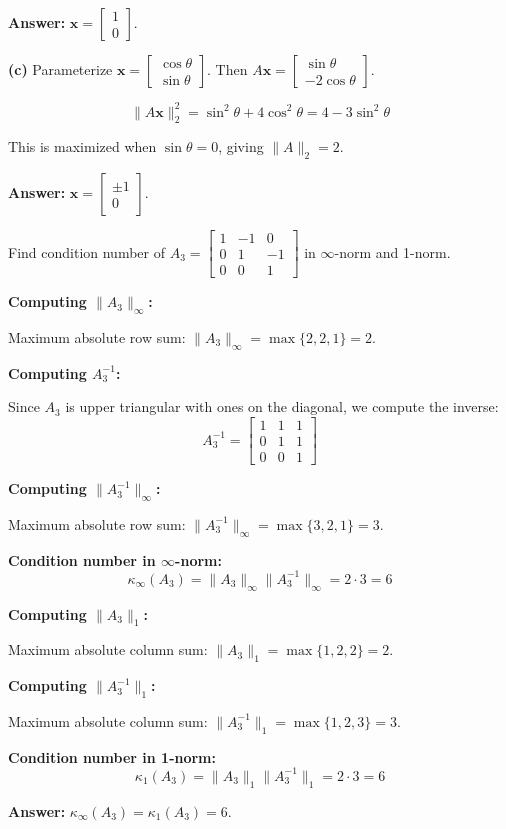 \documentclass[reqno]{exam}
\begin{document}
\begin{questions}
\begin{solution}
\textbf{Answer:} $\mathbf{x} = \begin{bmatrix} 1 \\ 0 \end{bmatrix}$.

\textbf{(c)} Parameterize $\mathbf{x} = \begin{bmatrix} \cos\theta \\ \sin\theta \end{bmatrix}$. Then $A\mathbf{x} = \begin{bmatrix} \sin\theta \\ -2\cos\theta \end{bmatrix}$.

\[
\|A\mathbf{x}\|_2^2 = \sin^2\theta + 4\cos^2\theta = 4 - 3\sin^2\theta
\]

This is maximized when $\sin\theta = 0$, giving $\|A\|_2 = 2$.

\textbf{Answer:} $\mathbf{x} = \begin{bmatrix} \pm 1 \\ 0 \end{bmatrix}$.
\end{solution}

\newpage 
\question[10] Find condition number of $A_3 = \begin{bmatrix} 1 & -1 & 0 \\ 0 & 1 & -1 \\ 0 & 0 & 1 \end{bmatrix}$ in $\infty$-norm and 1-norm.

\begin{solution}
\textbf{Computing $\|A_3\|_\infty$:}

Maximum absolute row sum: $\|A_3\|_\infty = \max\{2, 2, 1\} = 2$.

\textbf{Computing $A_3^{-1}$:}

Since $A_3$ is upper triangular with ones on the diagonal, we compute the inverse:
\[
A_3^{-1} = \begin{bmatrix} 1 & 1 & 1 \\ 0 & 1 & 1 \\ 0 & 0 & 1 \end{bmatrix}
\]

\textbf{Computing $\|A_3^{-1}\|_\infty$:}

Maximum absolute row sum: $\|A_3^{-1}\|_\infty = \max\{3, 2, 1\} = 3$.

\textbf{Condition number in $\infty$-norm:}
\[
\kappa_\infty(A_3) = \|A_3\|_\infty \|A_3^{-1}\|_\infty = 2 \cdot 3 = 6
\]

\textbf{Computing $\|A_3\|_1$:}

Maximum absolute column sum: $\|A_3\|_1 = \max\{1, 2, 2\} = 2$.

\textbf{Computing $\|A_3^{-1}\|_1$:}

Maximum absolute column sum: $\|A_3^{-1}\|_1 = \max\{1, 2, 3\} = 3$.

\textbf{Condition number in 1-norm:}
\[
\kappa_1(A_3) = \|A_3\|_1 \|A_3^{-1}\|_1 = 2 \cdot 3 = 6
\]

\textbf{Answer:} $\kappa_\infty(A_3) = \kappa_1(A_3) = 6$.
\end{solution}\end{questions}
\end{document}
